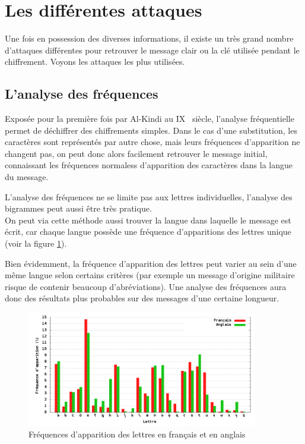 \section{Les différentes attaques}
Une fois en possession des diverses informations, il existe un
très grand nombre d'attaques différentes pour retrouver le message
clair ou la clé utilisée pendant le chiffrement. Voyons les
attaques les plus utilisées.

\subsection{L'analyse des fréquences\label{sec:AnalyseFrequences}}
Exposée pour la première fois par Al-Kindi au IX\ieme~ siècle,
l'analyse fréquentielle permet de déchiffrer des chiffrements
simples. Dans le cas d'une substitution, les
caractères sont représentés par autre chose, mais leurs fréquences
d'apparition ne changent pas, on peut donc alors facilement
retrouver le message initial, connaissant les fréquences
normaless d'apparition des caractères dans la langue du message.

L'analyse des fréquences ne se limite pas aux lettres
individuelles, l'analyse des bigrammes peut aussi être très
pratique.
\\

On peut via cette méthode aussi trouver la langue dans laquelle le
message est écrit, car chaque langue possède une fréquence
d'apparitions des lettres unique (voir la figure \ref{fig:Frequences}).

Bien évidemment, la fréquence d'apparition des lettres peut varier
au sein d'une même langue selon certains critères (par exemple un
message d'origine militaire risque de contenir beaucoup
d'abréviations). Une analyse des fréquences aura donc des résultats
plus probables sur des messages d'une certaine longueur.

\begin{figure}[h]
  \centering
    \includegraphics[width=0.9\textwidth]{plot/Frequences.png}
    \caption{Fréquences d'apparition des lettres en français et en
anglais}
  \label{fig:Frequences}
\end{figure}

